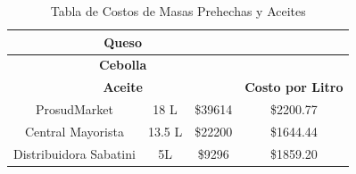 \documentclass[12pt]{article}
\begin{document}
\begin{table}[h!]
\begin{tabular}{|| c | c | c | c||}
        \multicolumn{3}{||c|}{\textbf{Queso}} & \\ [0.5ex] \hline \hline %
        \multicolumn{3}{||c|}{\textbf{Cebolla}} & \\ [0.5ex] \hline \hline %

        \multicolumn{3}{||c|}{\textbf{Aceite}} & \textbf{Costo por Litro} \\ [0.5ex] \hline \hline
        ProsudMarket & 18 L & \$39614 & \$2200.77 \\ \hline
        Central Mayorista & 13.5 L & \$22200 & \$1644.44 \\ \hline
        Distribuidora Sabatini & 5L & \$9296 & \$1859.20 \\ [1ex] \hline \hline



    \end{tabular}
    \caption{Tabla de Costos de Masas Prehechas y Aceites}
    \label{tab:costos_masas}
\end{table}
\end{document}
